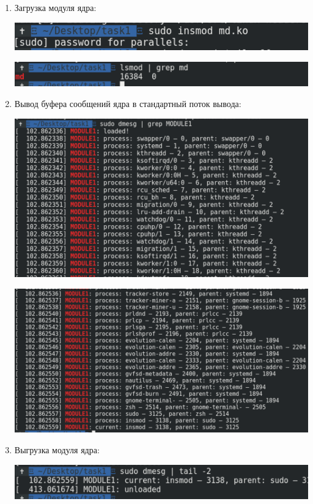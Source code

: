 \documentclass[a4paper,14pt]{extreport} %
\begin{document}
\begin{enumerate}

\item Загрузка модуля ядра:

\includegraphics[scale=0.6]{1}

\includegraphics[scale=0.6]{10}

\item Вывод буфера сообщений ядра в стандартный поток вывода:

\includegraphics[scale=0.6]{2}

\includegraphics[scale=0.6]{9}

\item  Выгрузка модуля ядра:

\includegraphics[scale=0.6]{11}

\end{enumerate}
\end{document}
